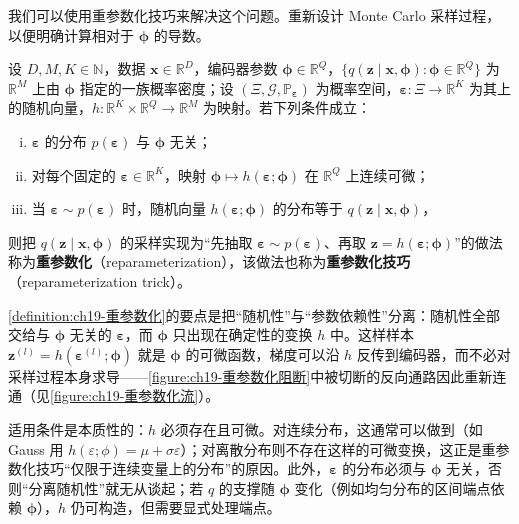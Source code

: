 \documentclass[../../main.tex]{subfiles}
\begin{document}
我们可以使用重参数化技巧来解决这个问题。重新设计 Monte Carlo 采样过程，以便明确计算相对于 $\bm{\phi}$ 的导数。

\begin{definition}[重参数化技巧]\label{definition:ch19-重参数化}
设 $D,M,K\in\mathbb{N}$，数据 $\bm{x}\in\mathbb{R}^{D}$，编码器参数 $\bm{\phi}\in\mathbb{R}^{Q}$，$\{q(\bm{z}\mid\bm{x},\bm{\phi}):\bm{\phi}\in\mathbb{R}^{Q}\}$ 为 $\mathbb{R}^{M}$ 上由 $\bm{\phi}$ 指定的一族概率密度；设 $(\Xi,\mathcal{G},\mathbb{P}_{\bm{\varepsilon}})$ 为概率空间，$\bm{\varepsilon}:\Xi\to\mathbb{R}^{K}$ 为其上的随机向量，$h:\mathbb{R}^{K}\times\mathbb{R}^{Q}\to\mathbb{R}^{M}$ 为映射。若下列条件成立：
\begin{enumerate}[(i)]
\item $\bm{\varepsilon}$ 的分布 $p(\bm{\varepsilon})$ 与 $\bm{\phi}$ 无关；
\item 对每个固定的 $\bm{\varepsilon}\in\mathbb{R}^{K}$，映射 $\bm{\phi}\mapsto h(\bm{\varepsilon};\bm{\phi})$ 在 $\mathbb{R}^{Q}$ 上连续可微；
\item 当 $\bm{\varepsilon}\sim p(\bm{\varepsilon})$ 时，随机向量 $h(\bm{\varepsilon};\bm{\phi})$ 的分布等于 $q(\bm{z}\mid\bm{x},\bm{\phi})$，
\end{enumerate}
则把 $q(\bm{z}\mid\bm{x},\bm{\phi})$ 的采样实现为“先抽取 $\bm{\varepsilon}\sim p(\bm{\varepsilon})$、再取 $\bm{z}=h(\bm{\varepsilon};\bm{\phi})$”的做法称为\textbf{重参数化}（reparameterization），该做法也称为\textbf{重参数化技巧}（reparameterization trick）。
\end{definition}

\begin{remark}
\cref{definition:ch19-重参数化}的要点是把“随机性”与“参数依赖性”分离：随机性全部交给与 $\bm{\phi}$ 无关的 $\bm{\varepsilon}$，而 $\bm{\phi}$ 只出现在确定性的变换 $h$ 中。这样样本 $\bm{z}^{(l)}=h(\bm{\varepsilon}^{(l)};\bm{\phi})$ 就是 $\bm{\phi}$ 的可微函数，梯度可以沿 $h$ 反传到编码器，而不必对采样过程本身求导——\cref{figure:ch19-重参数化阻断}中被切断的反向通路因此重新连通（见\cref{figure:ch19-重参数化流}）。

适用条件是本质性的：$h$ 必须存在且可微。对连续分布，这通常可以做到（如 Gauss 用 $h(\varepsilon;\phi)=\mu+\sigma\varepsilon$）；对离散分布则不存在这样的可微变换，这正是重参数化技巧“仅限于连续变量上的分布”的原因。此外，$\bm{\varepsilon}$ 的分布必须与 $\bm{\phi}$ 无关，否则“分离随机性”就无从谈起；若 $q$ 的支撑随 $\bm{\phi}$ 变化（例如均匀分布的区间端点依赖 $\bm{\phi}$），$h$ 仍可构造，但需要显式处理端点。
\end{remark}
\end{document}
